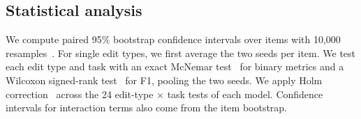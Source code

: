 \subsection{Statistical analysis}
We compute paired 95\% bootstrap confidence intervals over items with 10,000 resamples~\citep{efron1993bootstrap}. For single edit types, we first average the two seeds per item. We test each edit type and task with an exact McNemar test~\citep{mcnemar1947note} for binary metrics and a Wilcoxon signed-rank test~\citep{wilcoxon1945individual} for F1, pooling the two seeds. We apply Holm correction~\citep{holm1979simple} across the 24 edit-type $\times$ task tests of each model. Confidence intervals for interaction terms also come from the item bootstrap.
